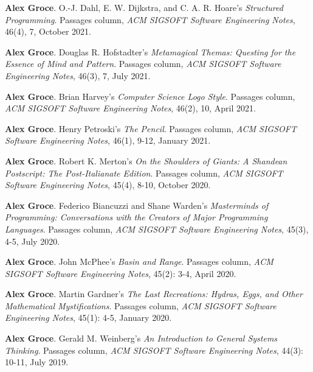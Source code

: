 \documentclass[ComputerScience]{vita}
\begin{document}
\begin{vita}
\begin{Columns, Book Reviews, and Magazine Articles}
\item {\bf Alex Groce}. 
\newblock O.-J. Dahl, E. W. Dijkstra, and C. A. R. Hoare’s \emph{Structured Programming}.
\newblock Passages column, \emph{ACM SIGSOFT Software Engineering 
  Notes}, 46(4), 7, October 2021.

\item {\bf Alex Groce}. 
\newblock Douglas R. Hofstadter's \emph{Metamagical Themas: Questing for the Essence of Mind and Pattern}. 
\newblock Passages column, \emph{ACM SIGSOFT Software Engineering 
  Notes}, 46(3), 7, July 2021.
  
\item {\bf Alex Groce}. 
\newblock Brian Harvey's \emph{Computer Science Logo Style}. 
\newblock Passages column, \emph{ACM SIGSOFT Software Engineering 
  Notes}, 46(2), 10, April 2021.

\item {\bf Alex Groce}. 
\newblock Henry Petroski's \emph{The Pencil}. 
\newblock Passages column, \emph{ACM SIGSOFT Software Engineering 
  Notes}, 46(1), 9-12, January 2021.
  
\item {\bf Alex Groce}. 
\newblock Robert K. Merton's \emph{On the Shoulders of Giants: A
  Shandean Postscript: The Post-Italianate Edition}. 
\newblock Passages column, \emph{ACM SIGSOFT Software Engineering 
  Notes}, 45(4), 8-10, October 2020.

\item {\bf Alex Groce}. 
\newblock Federico Biancuzzi and Shane Warden's \emph{Masterminds of 
  Programming: Conversations with the Creators of Major Programming Languages}. 
\newblock Passages column, \emph{ACM SIGSOFT Software Engineering 
  Notes}, 45(3), 4-5, July 2020.
  
\item {\bf Alex Groce}. 
\newblock John McPhee's \emph{Basin and Range}. 
\newblock Passages column, \emph{ACM SIGSOFT Software Engineering 
  Notes}, 45(2): 3-4, April 2020.
  
\item {\bf Alex Groce}. 
\newblock Martin Gardner's \emph{The Last Recreations: Hydras, Eggs, and Other Mathematical Mystifications}. 
\newblock Passages column, \emph{ACM SIGSOFT Software Engineering 
  Notes}, 45(1): 4-5, January 2020.
  
\item {\bf Alex Groce}. 
\newblock Gerald M. Weinberg's \emph{An Introduction to General
  Systems Thinking}.
\newblock Passages column, \emph{ACM SIGSOFT Software Engineering
  Notes}, 44(3): 10-11, July 2019.
  

\end{Columns, Book Reviews, and Magazine Articles}
\end{vita}
\end{document}

